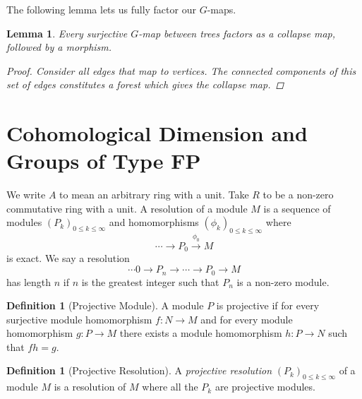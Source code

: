 \documentclass[12pt,parskip=full]{report}
\theoremstyle{plain}
\newtheorem{lem}[thm]{Lemma}
\theoremstyle{definition}
\newtheorem{dfn}[thm]{Definition}
\begin{document}
The following lemma lets us fully factor our \(G\)-maps.
\begin{lem}
    \label{lem:gmapfactor}
    Every surjective \(G\)-map between trees factors as a collapse map, followed by a morphism.
    \begin{proof}
        Consider all edges that map to vertices. The connected components of this set of edges constitutes a forest which gives the collapse map.
    \end{proof}
\end{lem}












\section{Cohomological Dimension and Groups of Type FP}


We write \(A\) to mean an arbitrary ring with a unit. Take \(R\) to be a non-zero commutative ring with a unit. A resolution of a module \(M\) is a sequence of modules \((P_k)_{0\leq k\leq \infty}\) and homomorphisms \((\phi_k)_{0\leq k\leq \infty}\) where \[\cdots \to P_0 \overset{\phi_0}{\to} M\] is exact. We say a resolution \[\cdots 0\to P_n\to \cdots\to P_0 \to M\] has length \(n\) if \(n\) is the greatest integer such that \(P_n\) is a non-zero module.

\begin{dfn}
    [Projective Module]
    A module \(P\) is projective if for every surjective module homomorphism \(f: N\to M\) and for every module homomorphism \(g: P\to M\) there exists a module homomorphism \(h: P\to N\) such that \(fh = g\).
\end{dfn}

\begin{dfn}
    [Projective Resolution]
    A \emph{projective resolution} \((P_k)_{0\leq k\leq \infty}\) of a module \(M\) is a resolution of \(M\) where all the \(P_k\) are projective modules.
\end{dfn}
\end{document}
